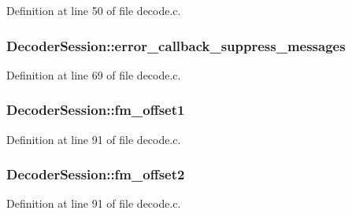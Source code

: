 Definition at line 50 of file decode.\+c.

\subsubsection[{\texorpdfstring{error\+\_\+callback\+\_\+suppress\+\_\+messages}{error_callback_suppress_messages}}]{ Decoder\+Session\+::error\+\_\+callback\+\_\+suppress\+\_\+messages}\hypertarget{struct_decoder_session_a0451e80ad7412cd846c734023b5c9012}{}\label{struct_decoder_session_a0451e80ad7412cd846c734023b5c9012}


Definition at line 69 of file decode.\+c.

\subsubsection[{\texorpdfstring{fm\+\_\+offset1}{fm_offset1}}]{ Decoder\+Session\+::fm\+\_\+offset1}\hypertarget{struct_decoder_session_aef385c730855cf0ebd737df4e7cfd7fc}{}\label{struct_decoder_session_aef385c730855cf0ebd737df4e7cfd7fc}


Definition at line 91 of file decode.\+c.

\subsubsection[{\texorpdfstring{fm\+\_\+offset2}{fm_offset2}}]{ Decoder\+Session\+::fm\+\_\+offset2}\hypertarget{struct_decoder_session_a0ea4201334a3b7e2e9e0052dd8411948}{}\label{struct_decoder_session_a0ea4201334a3b7e2e9e0052dd8411948}


Definition at line 91 of file decode.\+c.

